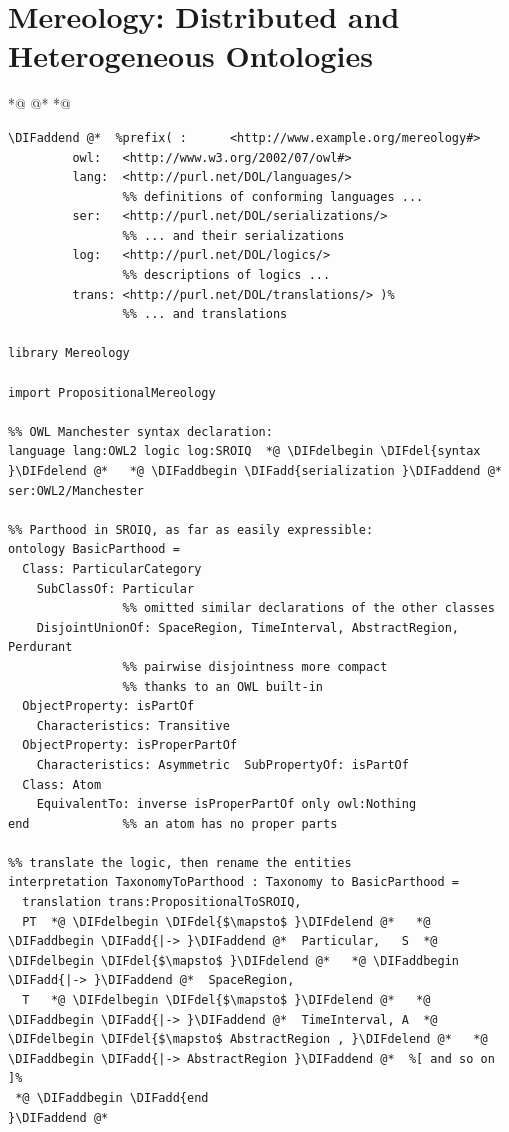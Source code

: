 \documentclass[10pt,fleqn,final]{scrreprt}
\newcommand{\sclause}[1]{\section{#1}}
\providecommand{\DIFadd}[1]{{\protect\color{blue}\uwave{#1}}} %
\providecommand{\DIFdel}[1]{{\protect\color{red}\sout{#1}}}                      %
\providecommand{\DIFaddbegin}{} %
\providecommand{\DIFaddend}{} %
\providecommand{\DIFdelbegin}{} %
\providecommand{\DIFdelend}{} %
\begin{document}
\sclause{Mereology: Distributed and Heterogeneous Ontologies}
\label{dist-het-onto}
 *@ \DIFdelbegin %
\DIFdelend @*   *@ \DIFaddbegin \begin{lstlisting}[basicstyle=\ttfamily,language=dolText,alsolanguage=owl2Manchester,alsolanguage=clif,escapechar=@,mathescape]
\DIFaddend @*  %prefix( :      <http://www.example.org/mereology#>
         owl:   <http://www.w3.org/2002/07/owl#>
         lang:  <http://purl.net/DOL/languages/>
                %% definitions of conforming languages ...
         ser:   <http://purl.net/DOL/serializations/>
                %% ... and their serializations
         log:   <http://purl.net/DOL/logics/>
                %% descriptions of logics ...
         trans: <http://purl.net/DOL/translations/> )%
                %% ... and translations

library Mereology

import PropositionalMereology

%% OWL Manchester syntax declaration: 
language lang:OWL2 logic log:SROIQ  *@ \DIFdelbegin \DIFdel{syntax }\DIFdelend @*   *@ \DIFaddbegin \DIFadd{serialization }\DIFaddend @*  ser:OWL2/Manchester           

%% Parthood in SROIQ, as far as easily expressible:
ontology BasicParthood =                             
  Class: ParticularCategory 
  	SubClassOf: Particular
                %% omitted similar declarations of the other classes
    DisjointUnionOf: SpaceRegion, TimeInterval, AbstractRegion, Perdurant
                %% pairwise disjointness more compact 
                %% thanks to an OWL built-in
  ObjectProperty: isPartOf        
  	Characteristics: Transitive
  ObjectProperty: isProperPartOf  
  	Characteristics: Asymmetric  SubPropertyOf: isPartOf 
  Class: Atom 
  	EquivalentTo: inverse isProperPartOf only owl:Nothing
end             %% an atom has no proper parts

%% translate the logic, then rename the entities
interpretation TaxonomyToParthood : Taxonomy to BasicParthood =
  translation trans:PropositionalToSROIQ,
  PT  *@ \DIFdelbegin \DIFdel{$\mapsto$ }\DIFdelend @*   *@ \DIFaddbegin \DIFadd{|-> }\DIFaddend @*  Particular,   S  *@ \DIFdelbegin \DIFdel{$\mapsto$ }\DIFdelend @*   *@ \DIFaddbegin \DIFadd{|-> }\DIFaddend @*  SpaceRegion,
  T   *@ \DIFdelbegin \DIFdel{$\mapsto$ }\DIFdelend @*   *@ \DIFaddbegin \DIFadd{|-> }\DIFaddend @*  TimeInterval, A  *@ \DIFdelbegin \DIFdel{$\mapsto$ AbstractRegion , }\DIFdelend @*   *@ \DIFaddbegin \DIFadd{|-> AbstractRegion }\DIFaddend @*  %[ and so on ]%
 *@ \DIFaddbegin \DIFadd{end
}\DIFaddend @*  


\end{lstlisting}
\end{document}
